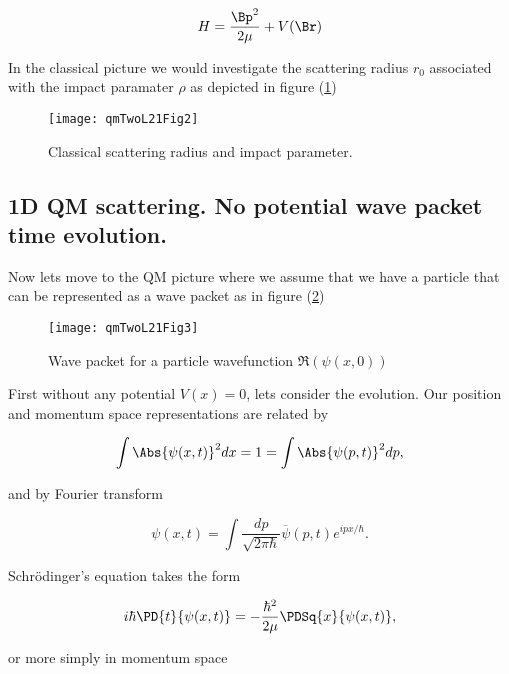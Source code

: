 \begin{equation}\label{eqn:qmTwoL21:50}
H = \frac{\Bp^2}{2 \mu} + V(\Br)
\end{equation}

In the classical picture we would investigate the scattering radius $r_0$ associated with the impact paramater $\rho$ as depicted in figure (\ref{fig:qmTwoL21:qmTwoL21Fig2})

\begin{figure}[htp]
   \centering
   \texttt{[image: qmTwoL21Fig2]}
   \caption{Classical scattering radius and impact parameter.}\label{fig:qmTwoL21:qmTwoL21Fig2}
\end{figure}

\subsection{1D QM scattering.  No potential wave packet time evolution.}

Now lets move to the QM picture where we assume that we have a particle that can be represented as a wave packet as in figure (\ref{fig:qmTwoL21:qmTwoL21Fig3})
\begin{figure}[htp]
   \centering
   \texttt{[image: qmTwoL21Fig3]}
   \caption{Wave packet for a particle wavefunction $\Re(\psi(x,0))$}\label{fig:qmTwoL21:qmTwoL21Fig3}
\end{figure}

First without any potential $V(x) = 0$, lets consider the evolution.  Our position and momentum space representations are related by

\begin{equation}\label{eqn:qmTwoL21:70}
\int \Abs{\psi(x, t)}^2 dx = 1 = \int \Abs{\psi(p, t)}^2 dp,
\end{equation}

and by Fourier transform

\begin{equation}\label{eqn:qmTwoL21:90}
\psi(x, t) = \int \frac{dp}{\sqrt{2 \pi \hbar}} \overline{\psi}(p, t) e^{i p x/\hbar}.
\end{equation}

Schr\"{o}dinger's equation takes the form

\begin{equation}\label{eqn:qmTwoL21:110}
i \hbar \PD{t}{\psi(x,t)} = - \frac{\hbar^2}{2 \mu} \PDSq{x}{\psi(x, t)},
\end{equation}

or more simply in momentum space

